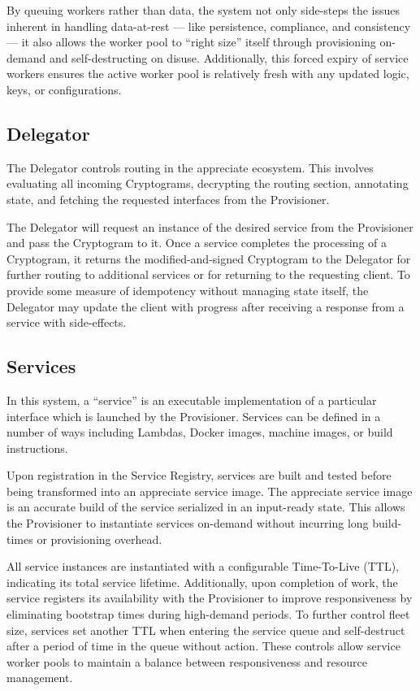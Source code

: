 \documentclass[a4paper,onecolumn, 10.5pt]{article}
\begin{document}
By queuing workers rather than data, the system not only side-steps the issues inherent in handling data-at-rest — like persistence, compliance, and consistency — it also allows the worker pool to “right size” itself through provisioning on-demand and self-destructing on disuse. Additionally, this forced expiry of service workers ensures the active worker pool is relatively fresh with any updated logic, keys, or configurations. 

\subsection{Delegator}
The Delegator controls routing in the appreciate ecosystem. This involves evaluating all incoming Cryptograms, decrypting the routing section, annotating state, and fetching the requested interfaces from the Provisioner.

The Delegator will request an instance of the desired service from the Provisioner and pass the Cryptogram to it. Once a service completes the processing of a Cryptogram, it returns the modified-and-signed Cryptogram to the Delegator for further routing to additional services or for returning to the requesting client. To provide some measure of idempotency without managing state itself, the Delegator may update the client with progress after receiving a response from a service with side-effects.


\subsection{Services}
In this system, a “service” is an executable implementation of a particular interface which is launched by the Provisioner. Services can be defined in a number of ways including Lambdas, Docker images, machine images, or build instructions.

Upon registration in the Service Registry, services are built and tested before being transformed into an appreciate service image. The appreciate service image is an accurate build of the service serialized in an input-ready state. This allows the Provisioner to instantiate services on-demand without incurring long build-times or provisioning overhead.

All service instances are instantiated with a configurable Time-To-Live (TTL), indicating its total service lifetime. Additionally, upon completion of work, the service registers its availability with the Provisioner to improve responsiveness by eliminating bootstrap times during high-demand periods. To further control fleet size, services set another TTL when entering the service queue and self-destruct after a period of time in the queue without action. These controls allow service worker pools to maintain a balance between responsiveness and resource management.
\end{document}
